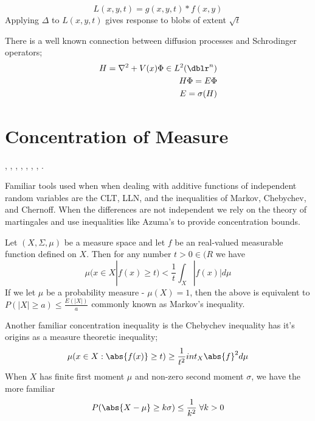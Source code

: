 \begin{equation*}
  L(x,y,t) =g(x,y,t) \ast f(x,y)
\end{equation*}
Applying $\Delta$ to $L(x,y,t)$ gives response to blobs of extent $\sqrt{t}$

There is a well known connection between diffusion processes and Schrodinger operators;
\begin{eqnarray*}
H = \nabla^2 + V(x) \Phi \in L^2(\dblr^n) \\
H \Phi = E \Phi \\
E = \sigma(H)
\end{eqnarray*}



\section*{Concentration of Measure}
 \cite{MCArora04expanderflows}, \cite{MCBartlett03convexity}, \cite{MCBoucheron04concentrationinequalities},
 \cite{MCFRIEDMAN96computingbetti}, \cite{MCLedoux04spectralgap}, \cite{MCMuyan_ablessing},
 \cite{MCSinclair92improvedbounds}, \cite{MCTalagrand95concentrationof}.

Familiar tools used when when dealing with additive functions of independent random variables are the CLT, LLN, and the inequalities of Markov, Chebychev, and Chernoff.  When the differences are not independent we rely on the theory of martingales and use inequalities like Azuma's to provide concentration bounds.

Let $(X,\Sigma,\mu)$ be a measure space and let $f$ be an  real-valued measurable function defined on $X$. Then for any number $t > 0 \in \mathbb({R}$ we have
\begin{equation*}
\mu(x \in X | f(x) \geq t) < \frac{1}{t} \int_X |f(x)| d \mu
\end{equation*} If we let $\mu$ be a probability measure - $\mu(X)=1$, then the above is equivalent to $P(|X| \geq a) \leq \frac{E(|X|)}{a}$ commonly known as Markov's inequality.

Another familiar concentration inequality is the Chebychev inequality has it's origins as a measure theoretic inequality;
\begin{equation*}
\mu({x \in X : \abs{f(x)} \geq t}) \geq \frac{1}{t^2}
int_X \abs{f}^2 d\mu
\end{equation*} When $X$ has finite first moment $\mu$ and non-zero second moment $\sigma$, we have the more familiar
\begin{equation*}
P( \abs{X - \mu} \geq k \sigma ) \leq \frac{1}{k^2} \; \forall k > 0
\end{equation*}


